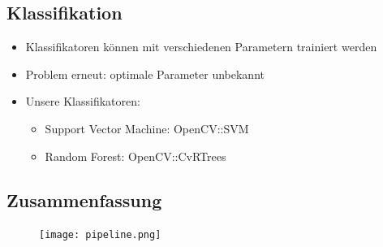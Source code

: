 \documentclass{beamer}
\begin{document}
\subsection{Klassifikation}
\begin{frame}
  \begin{itemize}
    \item Klassifikatoren können mit verschiedenen Parametern trainiert werden
    \item Problem erneut: optimale Parameter unbekannt
    \item Unsere Klassifikatoren:
      \begin{itemize}
        \item Support Vector Machine: OpenCV::SVM
        \item Random Forest: OpenCV::CvRTrees
      \end{itemize}
  \end{itemize}
\end{frame}


\subsection{Zusammenfassung}
\begin{frame}[plain]
  \begin{figure}
    \texttt{[image: pipeline.png]}
  \end{figure}
\end{frame}
\end{document}
